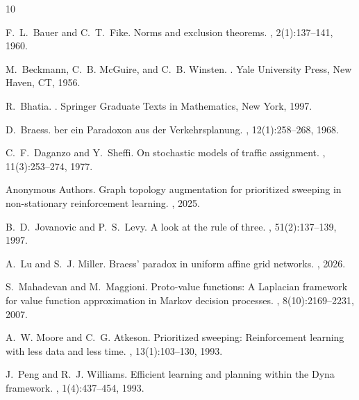 \documentclass[11pt,a4paper]{article}
\begin{document}


\begin{thebibliography}{10}

F.~L.~Bauer and C.~T.~Fike.
\newblock Norms and exclusion theorems.
, 2(1):137--141, 1960.

M.~Beckmann, C.~B. McGuire, and C.~B. Winsten.
.
\newblock Yale University Press, New Haven, CT, 1956.

R.~Bhatia.
.
\newblock Springer Graduate Texts in Mathematics, New York, 1997.

D.~Braess.
ber ein {P}aradoxon aus der {V}erkehrsplanung.
, 12(1):258--268, 1968.

C.~F.~Daganzo and Y.~Sheffi.
\newblock On stochastic models of traffic assignment.
, 11(3):253--274, 1977.

Anonymous Authors.
\newblock Graph topology augmentation for prioritized sweeping in non-stationary reinforcement learning.
, 2025.

B.~D.~Jovanovic and P.~S.~Levy.
\newblock A look at the rule of three.
, 51(2):137--139, 1997.

A.~Lu and S.~J. Miller.
\newblock Braess' paradox in uniform affine grid networks.
, 2026.

S.~Mahadevan and M.~Maggioni.
\newblock Proto-value functions: A {L}aplacian framework for value function approximation in {M}arkov decision processes.
, 8(10):2169--2231, 2007.

A.~W. Moore and C.~G. Atkeson.
\newblock Prioritized sweeping: Reinforcement learning with less data and less time.
, 13(1):103--130, 1993.

J.~Peng and R.~J. Williams.
\newblock Efficient learning and planning within the Dyna framework.
, 1(4):437--454, 1993.


\end{thebibliography}
\end{document}
